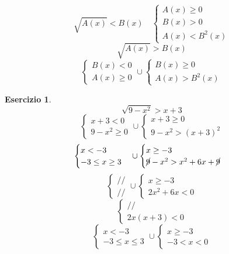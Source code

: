 \documentclass{article}
\theoremstyle{definition}
\newtheorem{exercise}{Esercizio}
\begin{document}
$$\sqrt{A\left(x\right)}<B\left(x\right)\quad\begin{cases}
	A\left(x\right)\ge 0\\
	B\left(x\right)>0\\
	A\left(x\right)<B^2\left(x\right)
\end{cases}$$
$$\sqrt{A\left(x\right)}>B\left(x\right)$$
$$\begin{cases}
	B\left(x\right)<0\\
	A\left(x\right)\ge0
\end{cases}\cup\begin{cases}
B\left(x\right)\ge0\\
A\left(x\right)>B^2\left(x\right)
\end{cases}$$
\begin{exercise}
	$$\sqrt{9-x^2}>x+3$$
	$$\begin{cases}
		x+3<0\\
		9-x^2\ge0
	\end{cases}\cup\begin{cases}
	x+3\ge0\\
	9-x^2>\left(x+3\right)^2
	\end{cases}$$
	$$\begin{cases}
		x<-3\\
		-3\le x\ge3
	\end{cases}\cup\begin{cases}
	x\ge-3\\
	\cancel{9}-x^2>x^2+6x+\cancel{9}
	\end{cases}$$
	$$\begin{cases}
		//\\
		//
	\end{cases}\cup\begin{cases}
	x\ge-3\\
	2x^2+6x<0
	\end{cases}$$
	$$\begin{cases}
		//\\
		2x\left(x+3\right)<0
	\end{cases}$$
	$$\begin{cases}
		x<-3\\
		-3\le x\le3
	\end{cases}\cup\begin{cases}
	x\ge-3\\
	-3<x<0
	\end{cases}$$
	\begin{center}
		\begin{tikzpicture}[scale=1.1, >=stealth]
			

\end{tikzpicture}
\end{center}
\end{exercise}
\end{document}
